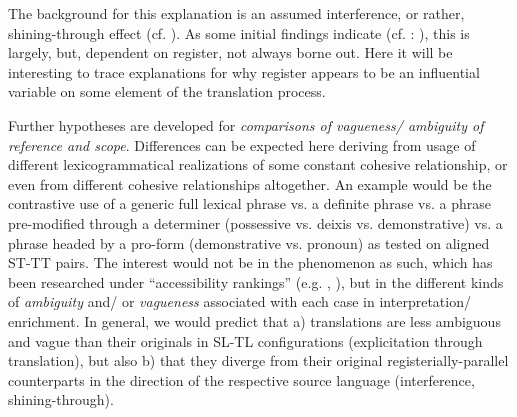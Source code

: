 \documentclass[output=paper]{LSP/langsci}
\begin{document}
\begin{exe}
\begin{exe}
\begin{exe}
\begin{exe}
\begin{exe}
The background for this explanation is an assumed interference, or rather, shining-through effect (cf. \citealt{Teich2003}). As some initial findings indicate (cf. \citealt{Kunzfc}: ), this is largely, but, dependent on register, not always borne out. Here it will be interesting to trace explanations for why register appears to be an influential variable on some element of the translation process.

Further hypotheses are developed for \textit{comparisons of vagueness/ ambiguity of reference and scope}. Differences can be expected here deriving from usage of different lexicogrammatical realizations of some constant cohesive relationship, or even from different cohesive relationships altogether. An example would be the contrastive use of a generic full lexical phrase vs. a definite phrase vs. a phrase pre-modified through a determiner (possessive vs. deixis vs. demonstrative) vs. a phrase headed by a pro-form (demonstrative vs. pronoun) as tested on aligned ST-TT pairs. The interest would not be in the phenomenon as such, which has been researched under ``accessibility rankings'' (e.g. \citealt{Ariel1990}, \citealt[45]{Hawkins2004}), but in the different kinds of \textit{ambiguity} and/ or \textit{vagueness} associated with each case in interpretation/ enrichment. In general, we would predict that a) translations are less ambiguous and vague than their originals in SL-TL configurations (explicitation through translation), but also b) that they diverge from their original registerially-parallel counterparts in the direction of the respective source language (interference, shining-through).


\end{exe}
\end{exe}
\end{exe}
\end{exe}
\end{exe}
\end{document}
